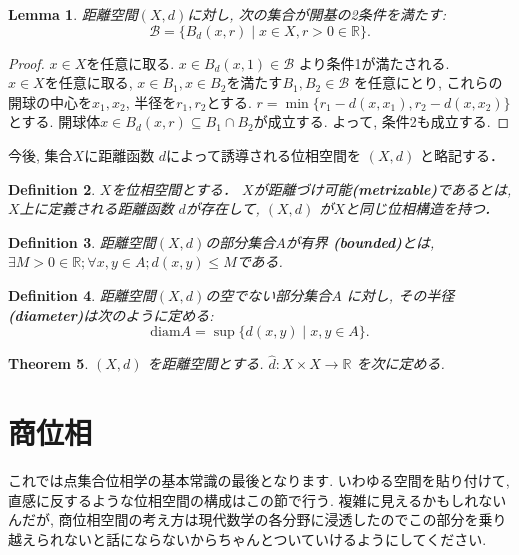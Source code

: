 \documentclass[lualatex]{ltjsbook}
\newtheorem{theorem}{Theorem}[chapter]
\newtheorem{lemma}[theorem]{Lemma}
\newtheorem{definition}[theorem]{Definition}
\theoremstyle{remark}
\theoremstyle{plain}
\begin{document}
\begin{lemma}
	距離空間$(X, d)$に対し,  次の集合が開基の2条件を満たす:
	 \[
	 \mathcal{B} = \{ B_d(x, r)  \mid  x \in X,  r >0 \in \mathbb{R}\} 
	 .\] 
\end{lemma}

\begin{proof}
	$x \in X$を任意に取る.  $x \in B_d(x, 1) \in \mathcal{B}$ より条件1が満たされる.\\
	$x \in X$を任意に取る,   $x \in B_1,  x \in B_2$を満たす$B_1, B_2 \in \mathcal{B}$ を任意にとり,  これらの開球の中心を$x_1, x_2$, 半径を$r_1, r_2$とする. $r = \min \{ r_1 - d(x, x_1),  r_2 -d(x, x_2)\} $ とする. 開球体$ x \in B_d(x, r) \subseteq  B_1 \cap B_2$が成立する. よって,  条件2も成立する.
\end{proof}

今後,  集合$X$に距離函数 $d$によって誘導される位相空間を $\left( X, d \right) $ と略記する．

\begin{definition}
	$X$を位相空間とする． $X$が距離づけ可能\textbf{(metrizable)}であるとは,   $X$上に定義される距離函数 $d$が存在して,   $\left( X, d \right) $ が$X$と同じ位相構造を持つ．
\end{definition}
\begin{definition}
	距離空間$\left( X,  d \right) $の部分集合$A$が有界 \textbf{(bounded)}とは,   $\exists M>0 \in \mathbb{R}; \forall x,  y \in A; d(x, y) \le M$である.
\end{definition}

\begin{definition}
	距離空間$\left( X , d \right) $の空でない部分集合$A$ に対し,  その半径\textbf{(diameter)}は次のように定める:
	\[
		\mathrm{diam}A= \sup \{d(x, y)  \mid x, y \in A\} 
	.\] 
\end{definition}

\begin{theorem}
	$\left( X, d \right) $ を距離空間とする. $ \hat{d}: X \times X \to \mathbb{R} $ を次に定める.
\end{theorem}
\section{商位相}

これでは点集合位相学の基本常識の最後となります.
いわゆる空間を貼り付けて,  直感に反するような位相空間の構成はこの節で行う.
複雑に見えるかもしれないんだが,  商位相空間の考え方は現代数学の各分野に浸透したのでこの部分を乗り越えられないと話にならないからちゃんとついていけるようにしてください. 
\end{document}
